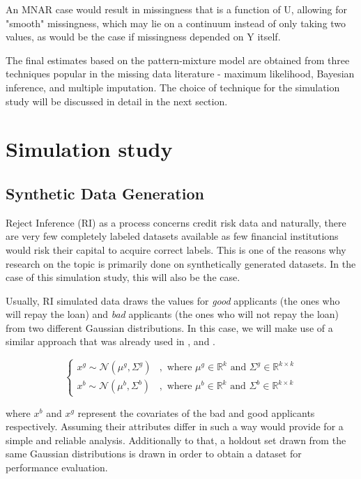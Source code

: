 \documentclass[11pt,a4paper]{article}
\begin{document}
An MNAR case would result in missingness that is a function of U, allowing for "smooth" missingness, which may lie on a continuum instead of only taking two values, as would be the case if missingness depended on Y itself.

The final estimates based on the pattern-mixture model are obtained from three techniques popular in the missing data literature - maximum likelihood, Bayesian inference, and multiple imputation. The choice of technique for the simulation study will be discussed in detail in the next section. 

\section{Simulation study} \label{simstudy}

\subsection{Synthetic Data Generation} \label{data_gen}

Reject Inference (RI) as a process concerns credit risk data and naturally, there are very few completely labeled datasets available as few financial institutions would risk their capital to acquire correct labels. This is one of the reasons why research on the topic is primarily done on synthetically generated datasets. In the case of this simulation study, this will also be the case. 

Usually, RI simulated data draws the values for \textit{good} applicants (the ones who will repay the loan) and \textit{bad} applicants (the ones who will not repay the loan) from two different Gaussian distributions. In this case, we will make use of a similar approach that was already used in \cite{maldonado2010semi}, \cite{ehrhardt_reject_2021}
and \cite{hoffmann2007inferring}. %


$$
\begin{cases}x^g \sim \mathcal{N}\left(\mu^g, \Sigma^g\right) & , \text { where } \mu^g \in \mathbb{R}^k \text { and } \Sigma^g \in \mathbb{R}^{k \times k} \\ x^b \sim \mathcal{N}\left(\mu^b, \Sigma^b\right) & , \text { where } \mu^b \in \mathbb{R}^k \text { and } \Sigma^b \in \mathbb{R}^{k \times k}
\end{cases}
$$

where $x^b$ and $x^g$ represent the covariates of the bad and good applicants respectively. Assuming their attributes differ in such a way would provide for a simple and reliable analysis. Additionally to that, a holdout set drawn from the same Gaussian distributions is drawn in order to obtain a dataset for performance evaluation. 
\end{document}
